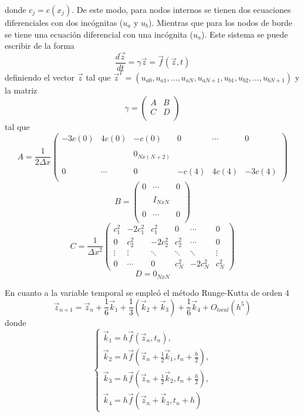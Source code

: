 \documentclass[aps,prb,twocolumn,superscriptaddress,floatfix,longbibliography,10pt]{revtex4-2}
\newcounter{para}
\begin{document}
donde $c_j = c(x_j)$. De este modo, para nodos internos se tienen dos ecuaciones diferenciales con dos incógnitas ($u_a$ y $u_b$). Mientras que para los nodos de borde se tiene una ecuación diferencial con una incógnita ($u_a$). Este sistema se puede escribir de la forma
\[\frac{d \vec{z}}{dt} = \gamma \vec{z} = \vec{f}(\vec{z},t)\]
definiendo el vector $\vec{z}$ tal que $\vec{z}^T = (u_{a 0}, u_{a 1}, \dots, u_{a N}, u_{a N+1}, u_{b 1}, u_{b 2}, \dots, u_{b N+1})$ y la matriz
\[\gamma = \begin{pmatrix}
  A & B \\
  C & D \\
  \end{pmatrix}\]
tal que
\[A = \frac{1}{2 \Delta x} \begin{pmatrix}
  -3c(0) & 4c(0) & -c(0) & 0 & \cdots & 0 \\ \\
  & & 0_{Nx(N+2)} & &\\ \\
  0 & \cdots & 0 & -c(4) & 4c(4) & -3c(4) \\
  \end{pmatrix} \]
\[B = \begin{pmatrix}
  0 & \cdots & 0 \\ \\
  & I_{NxN} & \\ \\
  0 & \cdots & 0 \\
  \end{pmatrix}
   \]
\[ C = \frac{1}{\Delta x^2} \begin{pmatrix}
  c_1^2 & -2 c_1^2 & c_1^2 & 0 & \cdots & 0 \\
  0 & c_2^2 & - 2 c_2^2 & c_2^2 & \cdots & 0 \\
  \vdots & \vdots & \ddots & \ddots & \ddots & \vdots \\
  0 & \cdots & 0 & c_N^2 & - 2 c_N^2 & c_N^2
  \end{pmatrix} \]
\[ D =  0_{NxN}\]

En cuanto a la variable temporal se empleó el método Runge-Kutta de orden 4
\begin{equation}
  \nonumber \vec{z}_{n+1} = \vec{z}_n + \frac{1}{6} \vec{k}_1 + \frac{1}{3} (\vec{k}_2 + \vec{k}_3) + \frac{1}{6} \vec{k}_4 + O_{local}(h^5)
  \label{eq:Runge_Kutta_4}
\end{equation}
donde
\[
  \left\{\begin{matrix}
    \vec{k}_1 = h \vec{f}(\vec{z}_n, t_n), \\ 
    \vec{k}_2 = h \vec{f} \left( \vec{z}_n + \frac{1}{2} \vec{k}_1 , t_n + \frac{h}{2}\right), \\
    \vec{k}_3 = h \vec{f} \left ( \vec{z}_n + \frac{1}{2} \vec{k}_2 , t_n + \frac{h}{2}  \right ), \\
    \vec{k}_4 = h \vec{f}(\vec{z}_n + \vec{k}_3, t_n + h)
  \end{matrix}\right.
\]
\end{document}
